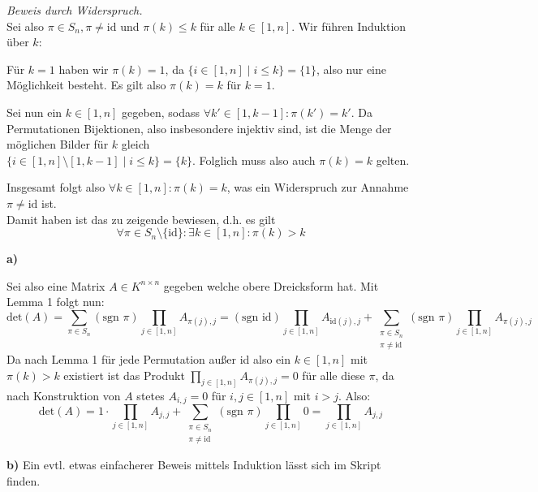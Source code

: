 \documentclass[a4paper,graphics,11pt]{article}
\begin{document}
\textit{Beweis durch Widerspruch.}\\
Sei also $\pi \in S_n, \pi \neq \text{id}$ und $\pi(k) \leq k$ für alle $k \in [1,n]$. Wir führen Induktion über $k:$

Für $k = 1$ haben wir $\pi(k) = 1$, da $\{i \in [1,n] \mid i \leq k\} = \{1\}$, also nur eine Möglichkeit besteht.
Es gilt also $\pi(k) = k$ für $k = 1$.

Sei nun ein $k \in [1,n]$ gegeben, sodass $\forall k' \in [1,k-1] : \pi(k') = k'$. Da Permutationen Bijektionen, also
insbesondere injektiv sind, ist die Menge der möglichen Bilder für $k$ gleich \\
$\{i \in [1,n]\setminus[1,k-1] \mid i\leq k\} = \{k\}$. Folglich muss also auch $\pi(k) = k$ gelten.

Insgesamt folgt also $\forall k \in [1,n] : \pi(k) = k$, was ein Widerspruch zur Annahme $\pi \neq \text{id}$ ist.\\

Damit haben ist das zu zeigende bewiesen, d.h. es gilt
$$
    \forall \pi \in S_n\setminus\{\text{id}\} : \exists k \in [1,n] : \pi(k) > k
$$

\textbf{a)}

Sei also eine Matrix $A \in K^{n \times n}$ gegeben welche obere Dreicksform hat.
Mit Lemma 1 folgt nun:
$$
    \text{det}(A)
    = \sum_{\pi \in S_n} (\text{sgn } \pi)\prod_{j\in [1,n]} A_{\pi(j),j}
    = (\text{sgn id}) \prod_{j\in [1,n]} A_{\text{id}(j),j}
        + \sum_{\substack{\pi \in S_n\\ \pi \neq \text{id}}} (\text{sgn } \pi)
        \prod_{j \in [1,n]} A_{\pi(j),j}
$$
Da nach Lemma 1 für jede Permutation außer id also ein $k \in [1,n]$ mit $\pi(k) > k$
existiert ist das Produkt $\prod_{j\in [1,n]} A_{\pi(j), j} = 0$ für alle diese
$\pi$, da nach Konstruktion von $A$ stetes $A_{i,j} = 0$ für $i,j \in [1,n]$ mit $i > j$. Also:
$$
    \text{det}(A) = 1\cdot \prod_{j \in [1,n]} A_{j,j} + \sum_{\substack{\pi \in S_n\\ \pi \neq \text{id}}}(\text{sgn } \pi) \prod_{j \in [1,n]} 0 = \prod_{j \in [1,n]} A_{j,j}
$$

\newpage

\textbf{b)}
Ein evtl. etwas einfacherer Beweis mittels Induktion lässt sich im Skript finden.
\end{document}
